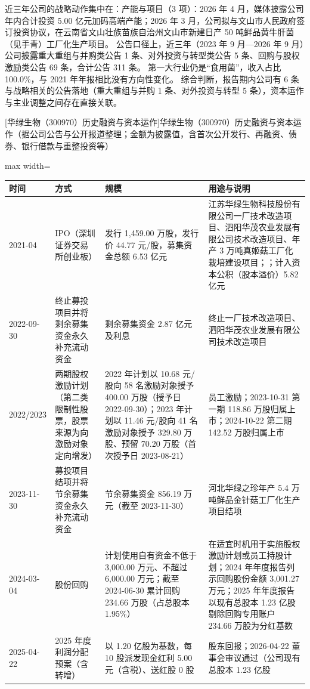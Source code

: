  近三年公司的战略动作集中在：产能与项目（3 项）：2026 年 4 月，媒体披露公司年内合计投资 5.00 亿元加码高端产能；2026 年 3 月，公司拟与文山市人民政府签订投资协议，在云南省文山壮族苗族自治州文山市新建日产 50 吨鲜品黄牛肝菌（见手青）工厂化生产项目。 公告口径上，近三年（2023 年 9 月---2026 年 9 月）公司披露重大重组与并购类公告 1 条、对外投资与转型类公告 5 条、回购与股权激励类公告 69 条，合计公告 311 条。 第一大行业仍是“食用菌”，收入占比 100.0\%，与 2021 年年报相比没有方向性变化。 综合判断，报告期内公司有 6 条与战略相关的公告落地（重大重组与并购 1 条、对外投资与转型 5 条），资本运作与主业调整之间存在直接关联。

\begin{center}\small\setlength{\tabcolsep}{4pt}
[华绿生物（300970）历史融资与资本运作]{华绿生物（300970）历史融资与资本运作（据公司公告与公开报道整理；金额为披露值，含首次公开发行、再融资、债券、银行借款与重整投资等）}
\begin{adjustbox}{max width=\textwidth}
\begin{tabular}{@{}p{1.45cm}p{2.55cm}p{4.05cm}p{4.95cm}@{}}
\toprule
时间 & 方式 & 规模 & 用途与说明 \\
\midrule
2021-04 & IPO（深圳证券交易所创业板） & 发行 1,\allowbreak{}459.00 万股，\allowbreak{}发行价 44.77 元/\allowbreak{}股，\allowbreak{}募集资金总额 6.53 亿元 & 江苏华绿生物科技股份有限公司一厂技术改造项目、\allowbreak{}泗阳华茂农业发展有限公司技术改造项目、\allowbreak{}年产 3 万吨真姬菇工厂化栽培建设项目；；计入资本公积（股本溢价）5.82 亿元 \\
2022-09-30 & 终止募投项目并将剩余募集资金永久补充流动资金 & 剩余募集资金 2.87 亿元及利息 & 终止一厂技术改造项目、\allowbreak{}泗阳华茂农业发展有限公司技术改造项目 \\
2022/\allowbreak{}2023 & 两期股权激励计划（第二类限制性股票，股票来源为向激励对象定向增发） & 2022 年计划以 10.68 元/\allowbreak{}股向 58 名激励对象授予 400.00 万股（授予日 2022-09-30）；2023 年计划以 11.46 元/\allowbreak{}股向 41 名激励对象授予 329.80 万股、\allowbreak{}预留 70.20 万股（首次授予日 2023-08-21） & 员工激励；2023-10-31 第一期 118.86 万股归属上市；2024-10-22 第二期 142.52 万股归属上市 \\
2023-11-30 & 募投项目结项并将节余募集资金永久补充流动资金 & 节余募集资金 856.19 万元（截至 2023-11-30） & 河北华绿之珍年产 5.4 万吨鲜品金针菇工厂化生产项目结项 \\
2024-03-04 & 股份回购 & 计划使用自有资金不低于 3,\allowbreak{}000.00 万元、\allowbreak{}不超过 6,\allowbreak{}000.00 万元；截至 2024-06-30 累计回购 234.66 万股（占总股本 1.95\%） & 在适宜时机用于实施股权激励计划或员工持股计划；2024 年年度报告列示回购股份金额 3,\allowbreak{}001.27 万元；2025 年年度报告以现有总股本 1.23 亿股剔除回购专用账户 234.66 万股为分红基数 \\
2025-04-22 & 2025 年度利润分配预案（含转增） & 以 1.20 亿股为基数，\allowbreak{}每 10 股派发现金红利 5.00 元（含税）、\allowbreak{}送红股 0 股 & 股东回报；2026-04-22 董事会审议通过（公司现有总股本 1.23 亿股 \\
\bottomrule
\end{tabular}
\end{adjustbox}
\end{center}

